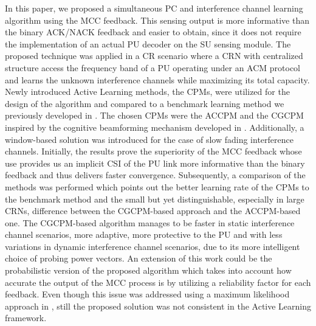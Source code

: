\documentclass[journal]{IEEEtran}
\begin{document}
In this paper, we proposed a simultaneous PC and interference channel learning algorithm using the MCC feedback. This sensing output is more informative than the binary ACK/NACK feedback and easier to obtain, since it does not require the implementation of an actual PU decoder on the SU sensing module. The proposed technique was applied in a CR scenario where a CRN with centralized structure access the frequency band of a PU operating under an ACM protocol and learns the unknown interference channels while maximizing its total capacity. Newly introduced Active Learning methods, the CPMs, were utilized for the design of the algorithm and compared to a benchmark learning method we previously developed in \cite{biban80}. The chosen CPMs were the ACCPM and the CGCPM inspired by the cognitive beamforming mechanism developed in \cite{biban73}. Additionally, a window-based solution was introduced for the case of slow fading interference channels. Initially, the results prove the superiority of the MCC feedback whose use provides us an implicit CSI of the PU link more informative than the binary feedback and thus delivers faster convergence. Subsequently, a comparison of the methods was performed which points out the better learning rate of the CPMs to the benchmark method and the small but yet distinguishable, especially in large CRNs, difference between the CGCPM-based approach and the ACCPM-based one. The CGCPM-based algorithm manages to be faster in static interference channel scenarios, more adaptive, more protective to the PU and with less variations in dynamic interference channel scenarios, due to its more intelligent choice of probing power vectors. An extension of this work could be the probabilistic version of the proposed algorithm which takes into account how accurate the output of the MCC process is by utilizing a reliability factor for each feedback. Even though this issue was addressed using a maximum likelihood approach in \cite{biban73}, still the proposed solution was not consistent in the Active Learning framework.







\end{document}

